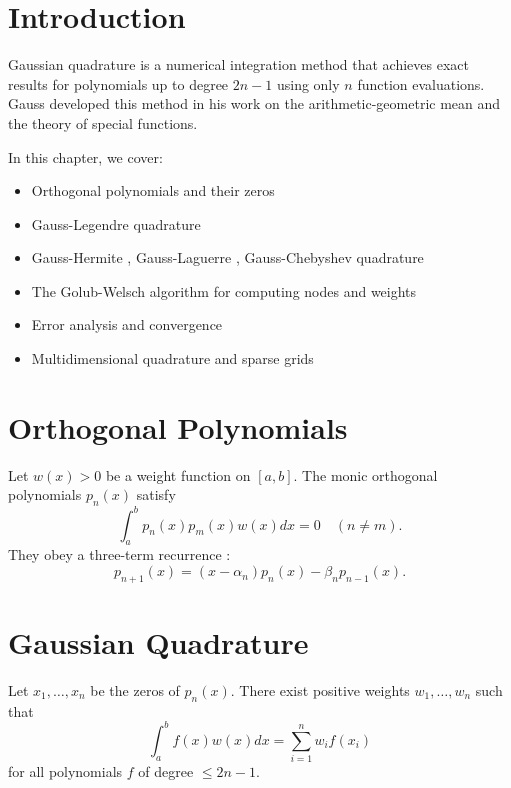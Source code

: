 \section{Introduction}

Gaussian quadrature  is a numerical integration method that achieves exact results for polynomials up to degree $2n-1$ using only $n$ function evaluations. Gauss developed this method in his work on the arithmetic-geometric mean and the theory of special functions.

In this chapter, we cover:
\begin{itemize}
    \item Orthogonal polynomials and their zeros
    \item Gauss-Legendre  quadrature
    \item Gauss-Hermite , Gauss-Laguerre , Gauss-Chebyshev  quadrature
    \item The Golub-Welsch algorithm  for computing nodes and weights
    \item Error analysis and convergence
    \item Multidimensional quadrature and sparse grids
\end{itemize}

\section{Orthogonal Polynomials}

Let $w(x) > 0$ be a weight function on $[a,b]$. The monic orthogonal polynomials  $p_n(x)$ satisfy
\[
\int_a^b p_n(x) p_m(x) w(x) dx = 0 \quad (n \ne m).
\]
They obey a three-term recurrence :
\[
p_{n+1}(x) = (x - \alpha_n) p_n(x) - \beta_n p_{n-1}(x).
\]

\section{Gaussian Quadrature}

\begin{theorem}
Let $x_1, \ldots, x_n$ be the zeros of $p_n(x)$. There exist positive weights $w_1, \ldots, w_n$ such that
\[
\int_a^b f(x) w(x) dx = \sum_{i=1}^n w_i f(x_i)
\]
for all polynomials $f$ of degree $\le 2n-1$.
\end{theorem}

